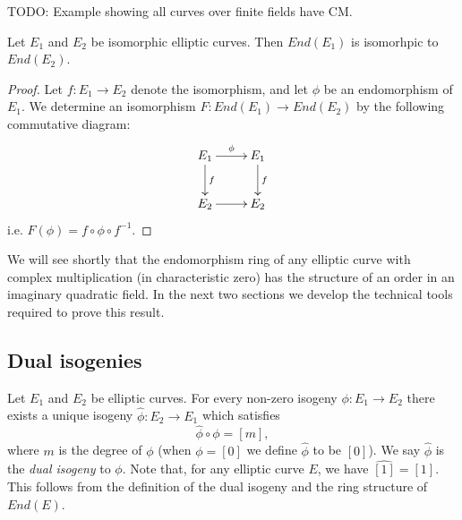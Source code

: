 \begin{example}
  \label{ex:finite-field-cm}
  TODO: Example showing all curves over finite fields have CM.
\end{example}

\begin{prop}
  \label{prop:iso-curves-iso-end-rings}
  Let $E_{1}$ and $E_{2}$ be isomorphic elliptic curves.  Then $End(E_{1})$ is
  isomorhpic to $End(E_{2})$.
\end{prop}
\begin{proof}
  Let $f \colon E_{1} \rightarrow E_{2}$ denote the isomorphism, and let $\phi$ be an
  endomorphism of $E_{1}$. We determine an isomorphism $F \colon End(E_{1}) \rightarrow
  End(E_{2})$ by the following commutative diagram:
\begin{equation*}
\xymatrix{
  E_{1} \ar[d]^{f} \ar[r]^{\phi} & E_{1} \ar[d]^{f} \\
  E_{2} \ar[r] & E_{2}}  
\end{equation*}
i.e. $F(\phi) = f \circ \phi \circ f^{-1}$.
\end{proof}
We will see shortly that the endomorphism ring of any elliptic curve with complex
multiplication (in characteristic zero) has the structure of an order in an imaginary
quadratic field.  In the next two sections we develop the technical tools required to
prove this result.

\subsection{Dual isogenies}
\label{sec:an-interlude-dual}

Let $E_{1}$ and $E_{2}$ be elliptic curves.  For every non-zero isogeny $\phi \colon
E_{1} \rightarrow E_{2}$ there exists a unique isogeny $\hat{\phi} \colon E_{2}
\rightarrow E_{1}$ which satisfies
\begin{equation}
  \label{eq:dual-isogeny}
  \hat{\phi} \circ \phi = \left[ m \right],
\end{equation}
where $m$ is the degree of $\phi$ (when $\phi = \left[ 0 \right]$ we define
$\hat{\phi}$ to be $\left[ 0 \right]$).  We say $\hat{\phi}$ is the \emph{dual
  isogeny} to $\phi$.  Note that, for any elliptic curve $E$, we have $\widehat{[1]}
= [1]$.  This follows from the definition of the dual isogeny and the ring structure
of $End(E)$.

